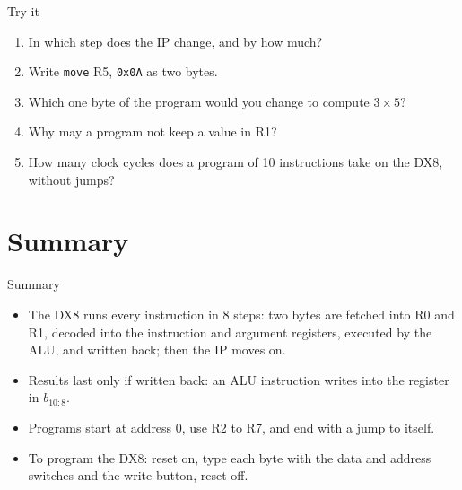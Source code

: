 \documentclass[10pt]{wosm-slides}
\begin{document}
\begin{frame}{Try it}
  \begin{enumerate}
    \item In which step does the IP change, and by how much?\par
    \item Write \texttt{move} R5, \texttt{0x0A} as two bytes.\par
    \item Which one byte of the program would you change to compute $3 \times 5$?\par
    \item Why may a program not keep a value in R1?\par
    \item How many clock cycles does a program of 10 instructions take on the DX8,
      without jumps?\par
  \end{enumerate}
\end{frame}

\section{Summary}

\begin{frame}{Summary}
  \begin{itemize}
    \item The DX8 runs every instruction in 8 steps: two bytes are fetched into R0 and
      R1, decoded into the instruction and argument registers, executed by the ALU,
      and written back; then the IP moves on.
    \item Results last only if written back: an ALU instruction writes into the
      register in $b_{10:8}$.
    \item Programs start at address 0, use R2 to R7, and end with a jump to itself.
    \item To program the DX8: reset on, type each byte with the data and address
      switches and the write button, reset off.
  \end{itemize}
\end{frame}
\end{document}
